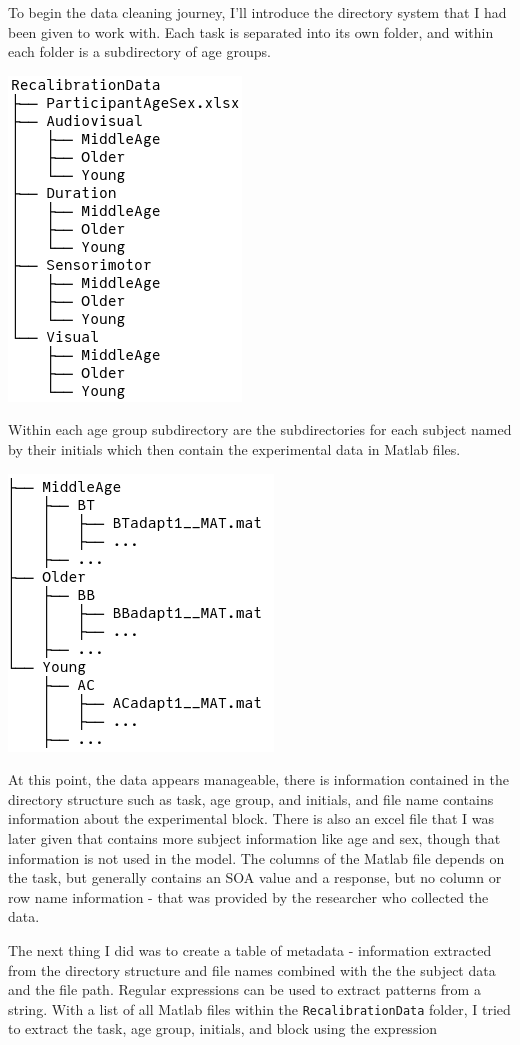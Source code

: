 \documentclass[11pt, oneside, openany]{scrbook}
\begin{document}
To begin the data cleaning journey, I'll introduce the directory system that I had been given to work with. Each task is separated into its own folder, and within each folder is a subdirectory of age groups.

\begin{center}\includegraphics[width=0.3\linewidth]{figures/data_dir} \end{center}

Within each age group subdirectory are the subdirectories for each subject named by their initials which then contain the experimental data in Matlab files.

\begin{center}\includegraphics[width=0.35\linewidth]{figures/data_subdir} \end{center}

At this point, the data appears manageable, there is information contained in the directory structure such as task, age group, and initials, and file name contains information about the experimental block. There is also an excel file that I was later given that contains more subject information like age and sex, though that information is not used in the model. The columns of the Matlab file depends on the task, but generally contains an SOA value and a response, but no column or row name information - that was provided by the researcher who collected the data.

The next thing I did was to create a table of metadata - information extracted from the directory structure and file names combined with the the subject data and the file path. Regular expressions can be used to extract patterns from a string. With a list of all Matlab files within the \texttt{RecalibrationData} folder, I tried to extract the task, age group, initials, and block using the expression
\end{document}

